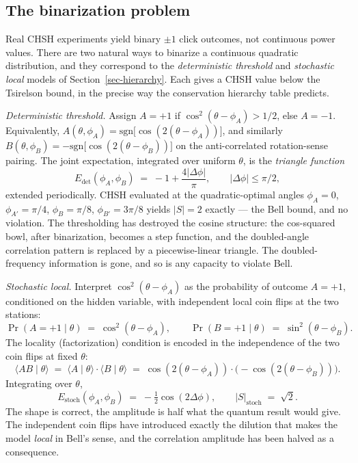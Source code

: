 \documentclass[
  11pt]{article}
\begin{document}
\subsection{The binarization problem}\label{the-binarization-problem}

Real CHSH experiments yield binary \(\pm 1\) click outcomes, not
continuous power values. There are two natural ways to binarize a
continuous quadratic distribution, and they correspond to the
\emph{deterministic threshold} and \emph{stochastic local} models of
Section~\ref{sec-hierarchy}. Each gives a CHSH value below the Tsirelson
bound, in the precise way the conservation hierarchy table predicts.

\emph{Deterministic threshold.} Assign \(A = +1\) if
\(\cos^2(\theta - \phi_A) > 1/2\), else \(A = -1\). Equivalently,
\(A(\theta, \phi_A) = \mathrm{sgn}\big[\cos(2(\theta - \phi_A))\big]\),
and similarly
\(B(\theta, \phi_B) = -\mathrm{sgn}\big[\cos(2(\theta - \phi_B))\big]\)
on the anti-correlated rotation-sense pairing. The joint expectation,
integrated over uniform \(\theta\), is the \emph{triangle function} \[
E_\text{det}(\phi_A, \phi_B) \;=\; -1 + \frac{4|\Delta\phi|}{\pi}, \qquad |\Delta\phi| \leq \pi/2,
\] extended periodically. CHSH evaluated at the quadratic-optimal angles
\(\phi_A = 0\), \(\phi_{A'} = \pi/4\), \(\phi_B = \pi/8\),
\(\phi_{B'} = 3\pi/8\) yields \(|S| = 2\) exactly --- the Bell bound,
and no violation. The thresholding has destroyed the cosine structure:
the cos-squared bowl, after binarization, becomes a step function, and
the doubled-angle correlation pattern is replaced by a piecewise-linear
triangle. The doubled-frequency information is gone, and so is any
capacity to violate Bell.

\emph{Stochastic local.} Interpret \(\cos^2(\theta - \phi_A)\) as the
probability of outcome \(A = +1\), conditioned on the hidden variable,
with independent local coin flips at the two stations: \[
\Pr(A = +1 \mid \theta) \;=\; \cos^2(\theta - \phi_A), \qquad \Pr(B = +1 \mid \theta) \;=\; \sin^2(\theta - \phi_B).
\] The locality (factorization) condition is encoded in the independence
of the two coin flips at fixed \(\theta\): \[
\langle AB \mid \theta \rangle \;=\; \langle A \mid \theta\rangle \cdot \langle B \mid \theta \rangle \;=\; \cos(2(\theta - \phi_A)) \cdot \big(\!-\!\cos(2(\theta - \phi_B))\big).
\] Integrating over \(\theta\), \[
E_\text{stoch}(\phi_A, \phi_B) \;=\; -\tfrac{1}{2}\cos(2\Delta\phi), \qquad |S|_\text{stoch} \;=\; \sqrt{2}.
\] The shape is correct, the amplitude is half what the quantum result
would give. The independent coin flips have introduced exactly the
dilution that makes the model \emph{local} in Bell's sense, and the
correlation amplitude has been halved as a consequence.
\end{document}
